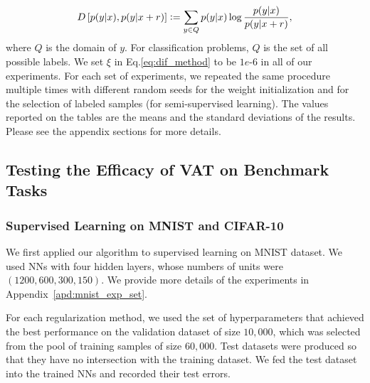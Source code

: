 \documentclass[10pt,journal,compsoc]{IEEEtran}
\newcommand{\defeq}{\vcentcolon=}
\newcommand\mnote[1]{\textcolor{blue}{(MIYATO: #1)}}
\newcommand\iwrite[1]{\textcolor{red}{Meada: #1}}
\begin{document}
\begin{eqnarray}
	D\left[p(y|x), p(y|x+r)\right] \defeq \sum_{y\in Q} p(y|x) \log \frac{p(y|x)}{p(y|x+r)},
\end{eqnarray}
where $Q$ is the domain of $y$. For classification problems, $Q$ is the set of all possible labels. 
We set $\xi$ in Eq.\eqref{eq:dif_method} to be $1e\text{-}6$ in all of our experiments. %
For each set of experiments, we repeated the same procedure multiple times with different random seeds for the weight initialization and for the selection of labeled samples (for semi-supervised learning). 
The values reported on the tables are the means and the standard deviations of the results. 
Please see the appendix sections for more details. 


\subsection{\label{subsec:efficacy}Testing the Efficacy of VAT on Benchmark Tasks}
\subsubsection{Supervised Learning on MNIST and CIFAR-10}
We first applied our algorithm to supervised learning on MNIST dataset. We used NNs with four hidden layers, whose numbers of units were $(1200, 600, 300, 150)$. 
We provide more details of the experiments in Appendix~\ref{apd:mnist_exp_set}. 

For each regularization method, we used the set of hyperparameters that achieved the best performance on the validation dataset of size $10,000$, which was selected from the pool of training samples of size $60,000$. 
Test datasets were produced so that they have no intersection with the training dataset.
We fed the test dataset into the trained NNs and recorded their test errors. 
\end{document}

